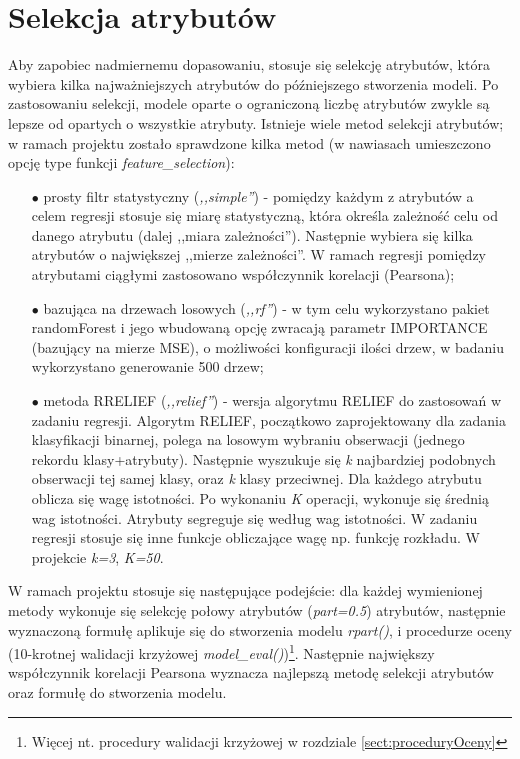 \documentclass[a4paper,11pt,twoside]{mwrep}  %
\begin{document}
\clearpage

\begingroup
\let\clearpage\relax
\chapter{Selekcja atrybutów}\label{chap:selekcja}

Aby zapobiec nadmiernemu dopasowaniu, stosuje się selekcję atrybutów, która wybiera kilka najważniejszych atrybutów do późniejszego stworzenia modeli. Po zastosowaniu selekcji, modele oparte o ograniczoną liczbę atrybutów zwykle są lepsze od opartych o wszystkie atrybuty. Istnieje wiele metod selekcji atrybutów; w ramach projektu zostało sprawdzone kilka metod (w nawiasach umieszczono opcję type funkcji \textit{feature\_selection}):
\begin{itemize}
	\item[$\bullet$] prosty filtr statystyczny (\textit{,,simple''}) - pomiędzy każdym z atrybutów a celem regresji stosuje się miarę statystyczną, która określa zależność celu od danego atrybutu (dalej ,,miara zależności''). Następnie wybiera się kilka atrybutów o największej ,,mierze zależności''. W ramach regresji pomiędzy atrybutami ciągłymi zastosowano współczynnik korelacji (Pearsona);
	\item[$\bullet$] bazująca na drzewach losowych (\textit{,,rf''}) - w tym celu wykorzystano pakiet randomForest i jego wbudowaną opcję zwracają parametr IMPORTANCE (bazujący na mierze MSE), o możliwości konfiguracji ilości drzew, w badaniu wykorzystano generowanie 500 drzew;
	\item[$\bullet$] metoda RRELIEF (\textit{,,relief''}) - wersja algorytmu RELIEF do zastosowań w zadaniu regresji. Algorytm RELIEF, początkowo zaprojektowany dla zadania klasyfikacji binarnej, polega na losowym wybraniu obserwacji (jednego rekordu klasy+atrybuty). Następnie wyszukuje się \textit{k} najbardziej podobnych obserwacji tej samej klasy, oraz \textit{k} klasy przeciwnej. Dla każdego atrybutu oblicza się wagę istotności. Po wykonaniu \textit{K} operacji, wykonuje się średnią wag istotności. Atrybuty segreguje się według wag istotności. W zadaniu regresji stosuje się inne funkcje obliczające wagę np. funkcję rozkładu. W projekcie \textit{k=3}, \textit{K=50}.
\end{itemize}
	
\par
W ramach projektu stosuje się następujące podejście: dla każdej wymienionej metody wykonuje się selekcję połowy atrybutów (\textit{part=0.5}) atrybutów, następnie wyznaczoną formułę aplikuje się do stworzenia modelu \textit{rpart()}, i procedurze oceny (10-krotnej walidacji krzyżowej \textit{model\_eval()})\footnote{Więcej nt. procedury walidacji krzyżowej w rozdziale \ref{sect:proceduryOceny}}. Następnie największy współczynnik korelacji Pearsona wyznacza najlepszą metodę selekcji atrybutów oraz formułę do stworzenia modelu.
\end{document}

